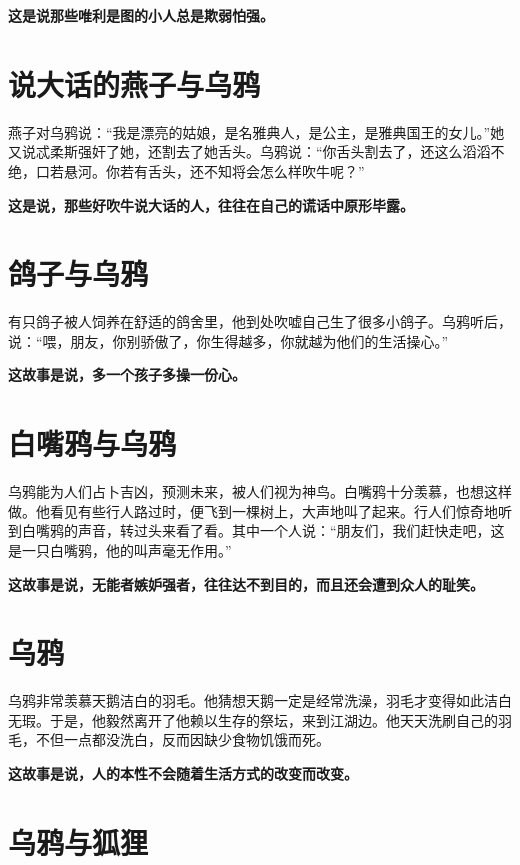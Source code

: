 {\bfseries \color{red}这是说那些唯利是图的小人总是欺弱怕强。}

\section{说大话的燕子与乌鸦}

燕子对乌鸦说：“我是漂亮的姑娘，是名雅典人，是公主，是雅典国王的女儿。”她又说忒柔斯强奸了她，还割去了她舌头。乌鸦说：“你舌头割去了，还这么滔滔不绝，口若悬河。你若有舌头，还不知将会怎么样吹牛呢？”

{\bfseries \color{red}这是说，那些好吹牛说大话的人，往往在自己的谎话中原形毕露。}

\section{鸽子与乌鸦}

有只鸽子被人饲养在舒适的鸽舍里，他到处吹嘘自己生了很多小鸽子。乌鸦听后，说：“喂，朋友，你别骄傲了，你生得越多，你就越为他们的生活操心。”

{\bfseries \color{red}这故事是说，多一个孩子多操一份心。}

\section{白嘴鸦与乌鸦}

乌鸦能为人们占卜吉凶，预测未来，被人们视为神鸟。白嘴鸦十分羡慕，也想这样做。他看见有些行人路过时，便飞到一棵树上，大声地叫了起来。行人们惊奇地听到白嘴鸦的声音，转过头来看了看。其中一个人说：“朋友们，我们赶快走吧，这是一只白嘴鸦，他的叫声毫无作用。”

{\bfseries \color{red}这故事是说，无能者嫉妒强者，往往达不到目的，而且还会遭到众人的耻笑。}

\section{乌鸦}

乌鸦非常羡慕天鹅洁白的羽毛。他猜想天鹅一定是经常洗澡，羽毛才变得如此洁白无瑕。于是，他毅然离开了他赖以生存的祭坛，来到江湖边。他天天洗刷自己的羽毛，不但一点都没洗白，反而因缺少食物饥饿而死。

{\bfseries \color{red}这故事是说，人的本性不会随着生活方式的改变而改变。}

\section{乌鸦与狐狸}

